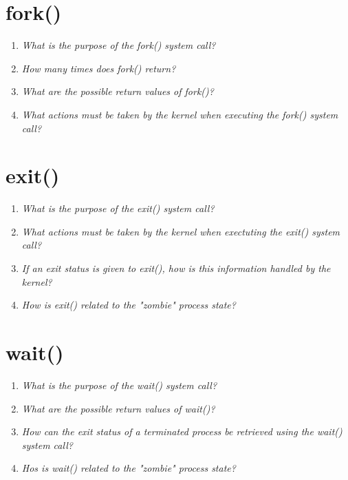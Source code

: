 \documentclass[a4paper]{article}
\begin{document}
\section{fork()}
\begin{enumerate}
  \item \textit{What is the purpose of the fork() system call?}
  \item \textit{How many times does fork() return?}
  \item \textit{What are the possible return values of fork()?}
  \item \textit{What actions must be taken by the kernel when executing the fork() system call?}
  
\end{enumerate}

\section{exit()}
\begin{enumerate}
  \item \textit{What is the purpose of the exit() system call?}
  \item \textit{What actions must be taken by the kernel when exectuting the exit() system call?}
  \item \textit{If an exit status is given to exit(), how is this information handled by the kernel?}
  \item \textit{How is exit() related to the  "zombie" process state?}
  
\end{enumerate}

\section{wait()}
\begin{enumerate}
  \item \textit{What is the purpose of the wait() system call?}
  \item \textit{What are the possible return values of wait()?}
  \item \textit{How can the exit status of a terminated process be retrieved using the wait() system call?}
  \item \textit{Hos is wait() related to the  "zombie" process state?}
  
\end{enumerate}
\end{document}

